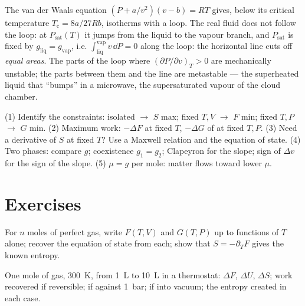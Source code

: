 \begin{remark}\label{rem:b2:thermodynamic-potentials:maxwellconstruction}
The van der Waals equation $(P + a/v^2)(v - b) = RT$ gives, below its
critical temperature $T_{\text{c}} = 8a/27Rb$, isotherms with a loop. The
real fluid does not follow the loop: at $P_{\text{sat}}(T)$ it jumps from
the liquid to the vapour branch, and $P_{\text{sat}}$ is fixed by $g_{\text{liq}}
= g_{\text{vap}}$, i.e. $\int_{\text{liq}}^{\text{vap}}v\,\dd P = 0$ along the
loop: the horizontal line cuts off \emph{equal areas}. The parts of the
loop where $(\partial P/\partial v)_T > 0$ are mechanically unstable; the
parts between them and the line are metastable --- the superheated
liquid that ``bumps'' in a microwave, the supersaturated vapour of the
cloud chamber.
\end{remark}

\begin{method}\label{meth:b2:thermodynamic-potentials:method}
(1) Identify the constraints: isolated $\to$ $S$ max; fixed $T,V$ $\to$
$F$ min; fixed $T,P$ $\to$ $G$ min. (2) Maximum work: $-\Delta F$ at fixed
$T$, $-\Delta G$ of  at fixed $T,P$. (3) Need a derivative of
$S$ at fixed $T$? Use a Maxwell relation and the equation of state.
(4) Two phases: compare $g$; coexistence $g_1 = g_2$; Clapeyron for the
slope; sign of $\Delta v$ for the sign of the slope. (5)  $\mu = g$ per mole: matter flows toward lower $\mu$.
\end{method}

\section{Exercises}

\begin{exercise}[$\star$]\label{exo:b2:thermodynamic-potentials:1}
For $n$ moles of perfect gas, write $F(T,V)$ and $G(T,P)$ up to
functions of $T$ alone; recover the equation of state from each; show
that $S = -\partial_TF$ gives the known entropy.
\end{exercise}

\begin{exercise}[$\star$]\label{exo:b2:thermodynamic-potentials:2}
One mole of gas, \qty{300}{K}, from \qty{1}{L} to \qty{10}{L} in a
thermostat: $\Delta F$, $\Delta U$, $\Delta S$; work recovered if reversible;
if against \qty{1}{bar}; if into vacuum; the entropy created in each
case.
\end{exercise}

